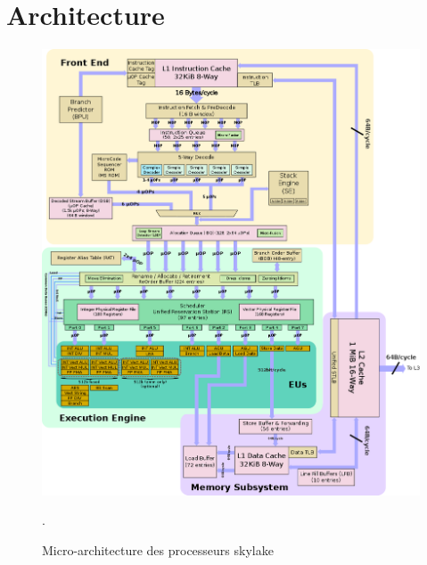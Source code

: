\chapter{Architecture}
\label{annexe:architecture}




\begin{figure}[hbtp]
    \center
    \includegraphics[]{images/cpu_skylake_architecture.png}
    \caption{\label{pic:cpu_skylake_architecture}Micro-architecture des processeurs skylake}.
\end{figure}